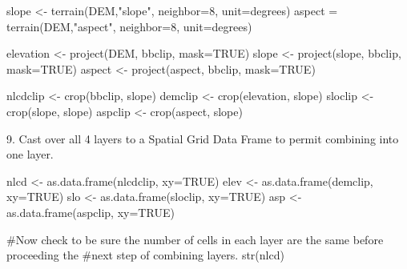 \documentclass[
  letterpaper,
]{book}
\newenvironment{Shaded}{\begin{snugshade}}{\end{snugshade}}
\newcommand{\AttributeTok}[1]{\textcolor[rgb]{0.40,0.45,0.13}{#1}}
\newcommand{\CommentTok}[1]{\textcolor[rgb]{0.37,0.37,0.37}{#1}}
\newcommand{\ConstantTok}[1]{\textcolor[rgb]{0.56,0.35,0.01}{#1}}
\newcommand{\DecValTok}[1]{\textcolor[rgb]{0.68,0.00,0.00}{#1}}
\newcommand{\FunctionTok}[1]{\textcolor[rgb]{0.28,0.35,0.67}{#1}}
\newcommand{\NormalTok}[1]{\textcolor[rgb]{0.00,0.23,0.31}{#1}}
\newcommand{\OtherTok}[1]{\textcolor[rgb]{0.00,0.23,0.31}{#1}}
\newcommand{\StringTok}[1]{\textcolor[rgb]{0.13,0.47,0.30}{#1}}
\begin{document}
\begin{Shaded}
\begin{Highlighting}[]
\NormalTok{slope }\OtherTok{\textless{}{-}} \FunctionTok{terrain}\NormalTok{(DEM,}\StringTok{"slope"}\NormalTok{, }\AttributeTok{neighbor=}\DecValTok{8}\NormalTok{, }\AttributeTok{unit=}\StringTok{\textquotesingle{}degrees\textquotesingle{}}\NormalTok{)}
\NormalTok{aspect }\OtherTok{=} \FunctionTok{terrain}\NormalTok{(DEM,}\StringTok{"aspect"}\NormalTok{, }\AttributeTok{neighbor=}\DecValTok{8}\NormalTok{, }\AttributeTok{unit=}\StringTok{\textquotesingle{}degrees\textquotesingle{}}\NormalTok{)}

\NormalTok{elevation }\OtherTok{\textless{}{-}} \FunctionTok{project}\NormalTok{(DEM, bbclip, }\AttributeTok{mask=}\ConstantTok{TRUE}\NormalTok{)}
\NormalTok{slope }\OtherTok{\textless{}{-}} \FunctionTok{project}\NormalTok{(slope, bbclip, }\AttributeTok{mask=}\ConstantTok{TRUE}\NormalTok{)}
\NormalTok{aspect }\OtherTok{\textless{}{-}} \FunctionTok{project}\NormalTok{(aspect, bbclip, }\AttributeTok{mask=}\ConstantTok{TRUE}\NormalTok{)}

\NormalTok{nlcdclip }\OtherTok{\textless{}{-}} \FunctionTok{crop}\NormalTok{(bbclip, slope)}
\NormalTok{demclip }\OtherTok{\textless{}{-}} \FunctionTok{crop}\NormalTok{(elevation, slope)}
\NormalTok{sloclip }\OtherTok{\textless{}{-}} \FunctionTok{crop}\NormalTok{(slope, slope)}
\NormalTok{aspclip }\OtherTok{\textless{}{-}} \FunctionTok{crop}\NormalTok{(aspect, slope)}
\end{Highlighting}
\end{Shaded}

9. Cast over all 4 layers to a Spatial Grid Data Frame to permit
combining into one layer.

\begin{Shaded}
\begin{Highlighting}[]
\NormalTok{nlcd }\OtherTok{\textless{}{-}} \FunctionTok{as.data.frame}\NormalTok{(nlcdclip, }\AttributeTok{xy=}\ConstantTok{TRUE}\NormalTok{) }
\NormalTok{elev }\OtherTok{\textless{}{-}} \FunctionTok{as.data.frame}\NormalTok{(demclip, }\AttributeTok{xy=}\ConstantTok{TRUE}\NormalTok{) }
\NormalTok{slo }\OtherTok{\textless{}{-}} \FunctionTok{as.data.frame}\NormalTok{(sloclip, }\AttributeTok{xy=}\ConstantTok{TRUE}\NormalTok{)}
\NormalTok{asp }\OtherTok{\textless{}{-}} \FunctionTok{as.data.frame}\NormalTok{(aspclip, }\AttributeTok{xy=}\ConstantTok{TRUE}\NormalTok{) }

\CommentTok{\#Now check to be sure the number of cells in each layer are the same before proceeding the}
\CommentTok{\#next step of combining layers.}
\FunctionTok{str}\NormalTok{(nlcd)}
\end{Highlighting}
\end{Shaded}
\end{document}
